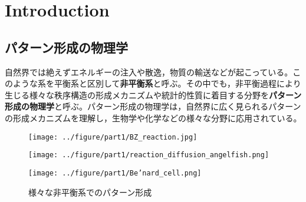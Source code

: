 \documentclass[autodetect-engine,dvi=dvipdfmx,a4paper,ja=standard,oneside,openany,11pt,draft]{bxjsbook}
\begin{document}
\chapter{Introduction}
\section{パターン形成の物理学}
自然界では絶えずエネルギーの注入や散逸，物質の輸送などが起こっている。このような系を平衡系と区別して\textbf{非平衡系}と呼ぶ。その中でも，非平衡過程により生じる様々な秩序構造の形成メカニズムや統計的性質に着目する分野を\textbf{パターン形成の物理学}と呼ぶ。パターン形成の物理学は，自然界に広く見られるパターンの形成メカニズムを理解し，生物学や化学などの様々な分野に応用されている。
\begin{figure}[H]
  \centering
  \begin{minipage}
    {0.32\textwidth}
    \centering
    \texttt{[image: ../figure/part1/BZ\_reaction.jpg]}
    \label{fig:BZ}
  \end{minipage}
  \begin{minipage}
    {0.32\textwidth}
    \centering
    \texttt{[image: ../figure/part1/reaction\_diffusion\_angelfish.png]}
    \label{fig:reaction_diffusion_angelfish}
  \end{minipage}
  \begin{minipage}
    {0.32\textwidth}
    \centering
    \texttt{[image: ../figure/part1/Be’nard\_cell.png]}
    \label{fig:Be’nard_cell}
  \end{minipage}
  \caption{様々な非平衡系でのパターン形成}
  \label{fig:pattern_formation}
\end{figure}
\end{document}
